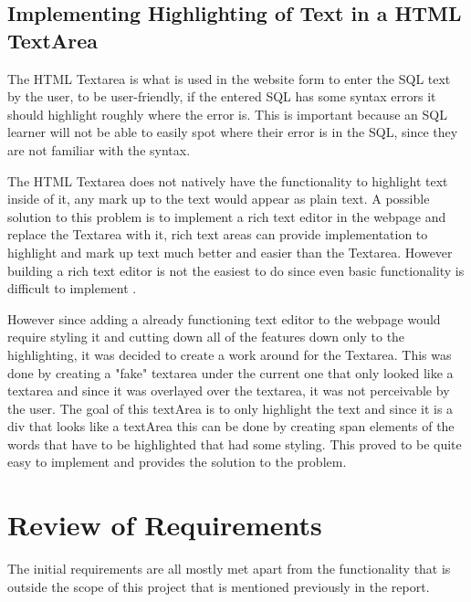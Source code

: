 \subsection{Implementing Highlighting of Text in a HTML TextArea}

The HTML Textarea is what is used in the website form to enter the SQL text by the user, to be user-friendly, if the entered SQL has some syntax errors it should highlight roughly where the error is. This is important because an SQL learner will not be able to easily spot where their error is in the SQL, since they are not familiar with the syntax. 

The HTML Textarea does not natively have the functionality to highlight text inside of it, any mark up to the text would appear as plain text. A possible solution to this problem is to implement a rich text editor in the webpage and replace the Textarea with it, rich text areas can provide implementation to highlight and mark up text much better and easier than the Textarea. However building a rich text editor is not the easiest to do since even basic functionality is difficult to implement \cite{highlightText}.

However since adding a already functioning text editor to the webpage would require styling it and cutting down all of the features down only to the highlighting, it was decided to create a work around for the Textarea. This was done by creating a "fake" textarea under the current one that only looked like a textarea and since it was overlayed over the textarea, it was not perceivable by the user. The goal of this textArea is to only highlight the text and since it is a div that looks like a textArea this can be done by creating span elements of the words that have to be highlighted that had some styling. This proved to be quite easy to implement and provides the solution to the problem.

\newpage

\section{Review of Requirements}

The initial requirements are all mostly met apart from the functionality that is outside the scope of this project that is mentioned previously in the report. 

